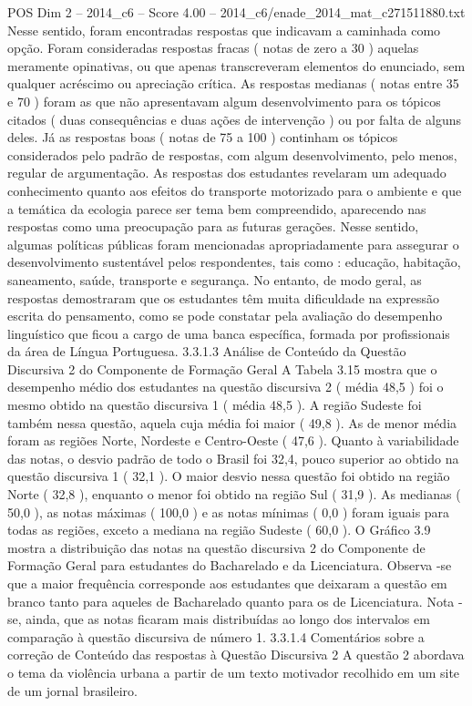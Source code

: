 \begin{textsample}{POS Dim 2 – 2014\_c6 – Score 4.00 – 2014\_c6/enade\_2014\_mat\_c271511880.txt}
Nesse sentido, foram encontradas respostas que indicavam a caminhada como opção.
Foram consideradas respostas fracas ( notas de zero a 30 ) aquelas meramente opinativas, ou que apenas transcreveram elementos do enunciado, sem qualquer acréscimo ou apreciação crítica.
As respostas medianas ( notas entre 35 e 70 ) foram as que não apresentavam algum desenvolvimento para os tópicos citados ( duas consequências e duas ações de intervenção ) ou por falta de alguns deles.
Já as respostas boas ( notas de 75 a 100 ) continham os tópicos considerados pelo padrão de respostas, com algum desenvolvimento, pelo menos, regular de argumentação.
As respostas dos estudantes revelaram um adequado conhecimento quanto aos efeitos do transporte motorizado para o ambiente e que a temática da ecologia parece ser tema bem compreendido, aparecendo nas respostas como uma preocupação para as futuras gerações.
Nesse sentido, algumas políticas públicas foram mencionadas apropriadamente para assegurar o desenvolvimento sustentável pelos respondentes, tais como : educação, habitação, saneamento, saúde, transporte e segurança.
No entanto, de modo geral, as respostas demostraram que os estudantes têm muita dificuldade na expressão escrita do pensamento, como se pode constatar pela avaliação do desempenho linguístico que ficou a cargo de uma banca específica, formada por profissionais da área de Língua Portuguesa. 3.3.1.3 Análise de Conteúdo da Questão Discursiva 2 do Componente de Formação Geral A Tabela 3.15 mostra que o desempenho médio dos estudantes na questão discursiva 2 ( média 48,5 ) foi o mesmo obtido na questão discursiva 1 ( média 48,5 ).
A região Sudeste foi também nessa questão, aquela cuja média foi maior ( 49,8 ).
As de menor média foram as regiões Norte, Nordeste e Centro-Oeste ( 47,6 ).
Quanto à variabilidade das notas, o desvio padrão de todo o Brasil foi 32,4, pouco superior ao obtido na questão discursiva 1 ( 32,1 ).
O maior desvio nessa questão foi obtido na região Norte ( 32,8 ), enquanto o menor foi obtido na região Sul ( 31,9 ).
As medianas ( 50,0 ), as notas máximas ( 100,0 ) e as notas mínimas ( 0,0 ) foram iguais para todas as regiões, exceto a mediana na região Sudeste ( 60,0 ).
O Gráfico 3.9 mostra a distribuição das notas na questão discursiva 2 do Componente de Formação Geral para estudantes do Bacharelado e da Licenciatura.
Observa -se que a maior frequência corresponde aos estudantes que deixaram a questão em branco tanto para aqueles de Bacharelado quanto para os de Licenciatura.
Nota -se, ainda, que as notas ficaram mais distribuídas ao longo dos intervalos em comparação à questão discursiva de número 1. 3.3.1.4 Comentários sobre a correção de Conteúdo das respostas à Questão Discursiva 2 A questão 2 abordava o tema da violência urbana a partir de um texto motivador recolhido em um site de um jornal brasileiro.

\end{textsample}

